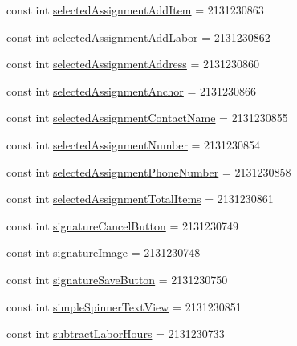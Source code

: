 \begin{DoxyCompactItemize}
\item 
const int \hyperlink{class_field_service_1_1_android_1_1_resource_1_1_id_a0bfdd9fc85eb81f44abb858ad6f38e31}{selected\+Assignment\+Add\+Item} = 2131230863
\item 
const int \hyperlink{class_field_service_1_1_android_1_1_resource_1_1_id_a87bc5c9af68f2bedf72d88293256792f}{selected\+Assignment\+Add\+Labor} = 2131230862
\item 
const int \hyperlink{class_field_service_1_1_android_1_1_resource_1_1_id_a262e210c4d9e55c54f7263a9b8412b34}{selected\+Assignment\+Address} = 2131230860
\item 
const int \hyperlink{class_field_service_1_1_android_1_1_resource_1_1_id_a43139d9f5073df2401e59317c9988fb8}{selected\+Assignment\+Anchor} = 2131230866
\item 
const int \hyperlink{class_field_service_1_1_android_1_1_resource_1_1_id_ab08aa98331e51ecc155494bbac0780c5}{selected\+Assignment\+Contact\+Name} = 2131230855
\item 
const int \hyperlink{class_field_service_1_1_android_1_1_resource_1_1_id_a6865709c03b6170c533fbd95f8acd846}{selected\+Assignment\+Number} = 2131230854
\item 
const int \hyperlink{class_field_service_1_1_android_1_1_resource_1_1_id_abfebc6bd4c241703de5d9007209a292e}{selected\+Assignment\+Phone\+Number} = 2131230858
\item 
const int \hyperlink{class_field_service_1_1_android_1_1_resource_1_1_id_a4d2e2c82c9a8359bf9cad3321ac1526c}{selected\+Assignment\+Total\+Items} = 2131230861
\item 
const int \hyperlink{class_field_service_1_1_android_1_1_resource_1_1_id_af456585327740da2295d6124b3bb61da}{signature\+Cancel\+Button} = 2131230749
\item 
const int \hyperlink{class_field_service_1_1_android_1_1_resource_1_1_id_a9590d9ec615ce9732caa531629910967}{signature\+Image} = 2131230748
\item 
const int \hyperlink{class_field_service_1_1_android_1_1_resource_1_1_id_aa21dc508b7e36a4185255b9172855d98}{signature\+Save\+Button} = 2131230750
\item 
const int \hyperlink{class_field_service_1_1_android_1_1_resource_1_1_id_a386e7621722dacf9aec2fb8a06e22d15}{simple\+Spinner\+Text\+View} = 2131230851
\item 
const int \hyperlink{class_field_service_1_1_android_1_1_resource_1_1_id_a53d91681092432452cfbdfb63528505f}{subtract\+Labor\+Hours} = 2131230733
\item 

\end{DoxyCompactItemize}
